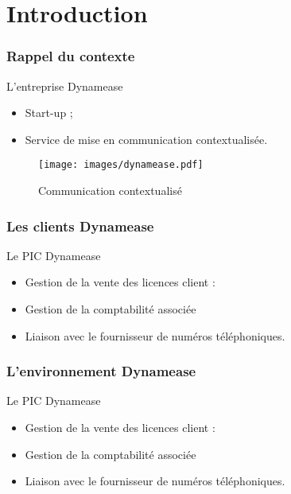\section{Introduction}
\author{Kévin Moreau}


\begin{frame}
	\frametitle{Rappel du contexte}

	\begin{block}{L'entreprise Dynamease}
	 \begin{itemize}
      \item Start-up ;
	  \item Service de mise en communication contextualisée.
	 \end{itemize}
	\end{block}

    \begin{center}
	  \begin{figure}
        \texttt{[image: images/dynamease.pdf]}
	   \caption{Communication contextualisé}
	  \end{figure}
	\end{center}
\end{frame}

\begin{frame}
	\frametitle{Les clients Dynamease}

    \begin{block}{Le PIC Dynamease}
	 \begin{itemize}
	  \item Gestion de la vente des licences client :
      \item Gestion de la comptabilité associée
	  \item Liaison avec le fournisseur de numéros téléphoniques.
	 \end{itemize}
	\end{block}

\end{frame}

\begin{frame}
	\frametitle{L'environnement Dynamease}

    \begin{block}{Le PIC Dynamease}
	 \begin{itemize}
	  \item Gestion de la vente des licences client :
      \item Gestion de la comptabilité associée
	  \item Liaison avec le fournisseur de numéros téléphoniques.
	 \end{itemize}
	\end{block}

\end{frame}


